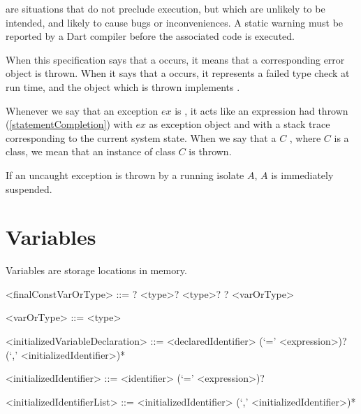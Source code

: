\documentclass[makeidx]{article}
\begin{document}

\LMHash{}%
are situations that do not preclude execution,
but which are unlikely to be intended,
and likely to cause bugs or inconveniences.
A static warning must be reported by a Dart compiler
before the associated code is executed.

\LMHash{}%
When this specification says that a  occurs,
it means that a corresponding error object is thrown.
When it says that a  occurs,
it represents a failed type check at run time,
and the object which is thrown implements .

\LMHash{}%
Whenever we say that an exception $ex$ is
,
it acts like an expression had thrown (\ref{statementCompletion})
with $ex$ as exception object and with a stack trace
corresponding to the current system state.
When we say that a $C$ ,
where $C$ is a class, we mean that an instance of class $C$ is thrown.

\LMHash{}%
If an uncaught exception is thrown by a running isolate $A$,
$A$ is immediately suspended.


\section{Variables}

\LMHash{}%
Variables are storage locations in memory.

\begin{grammar}
<finalConstVarOrType> ::= \LATE? \FINAL{} <type>?
  \alt \CONST{} <type>?
  \alt \LATE? <varOrType>

<varOrType> ::= \VAR{}
  \alt <type>

<initializedVariableDeclaration> ::= \gnewline{}
  <declaredIdentifier> (`=' <expression>)? (`,' <initializedIdentifier>)*

<initializedIdentifier> ::= <identifier> (`=' <expression>)?

<initializedIdentifierList> ::=
  <initializedIdentifier> (`,' <initializedIdentifier>)*
\end{grammar}
\end{document}

